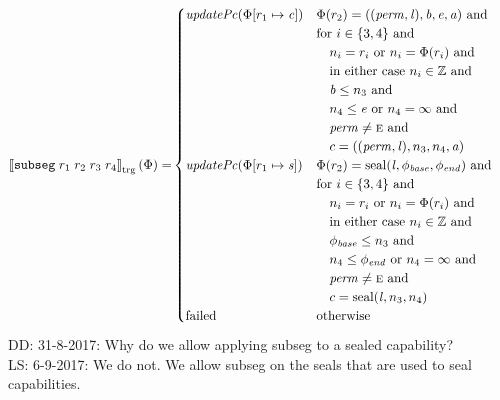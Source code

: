 \documentclass[a4paper]{article}
\newcommand\lau[1]{{\color{purple} \sf \footnotesize {LS: #1}}\\}
\newcommand\dominique[1]{{\color{purple} \sf \footnotesize {DD: #1}}\\}
\newcommand{\sem}[1]{\left\llbracket #1 \right\rrbracket}
\newcommand{\tsem}[2][\Phi]{\sem{#2}_{\mathrm{trg}}(#1)}
\newcommand{\tand}{\text{ and }}
\newcommand{\totherwise}{\text{otherwise }}
\newcommand{\targetcolor}[1]{\color{black}}
\newcommand{\trg}[1]{{\targetcolor{} #1}}
\newcommand{\zinstr}[1]{\texttt{#1}}
\newcommand{\fourinstr}[5]{
  \ifthenelse{\equal{#2#3#4#5}{}}
  {\zinstr{#1}}
  {\zinstr{#1} \; #2 \; #3 \; #4 \; #5}
}
\newcommand{\tsubseg}[4]{\fourinstr{\trg{subseg}}{#1}{#2}{#3}{#4}}
\newcommand{\ints}{\mathbb{Z}}
\newcommand{\update}[2]{[#1 \mapsto #2]}
\newcommand{\shareddom}[1]{\mathrm{#1}}
\newcommand{\perm}{\var{perm}}
\newcommand{\lin}{\var{l}}
\newcommand{\seal}[1]{\shareddom{seal}(#1)}
\newcommand{\failed}{\mathrm{failed}}
\newcommand{\var}[1]{\mathit{#1}}
\newcommand{\baddr}{\var{b}}
\newcommand{\eaddr}{\var{e}}
\newcommand{\aaddr}{\var{a}}
\newcommand{\plainperm}[1]{\textsc{#1}}
\newcommand{\enter}{\plainperm{e}}
\newcommand{\plainfun}[2]{
  \ifthenelse{\equal{#2}{}}
  {\mathit{#1}}
  {\mathit{#1}(#2)}
}
\newcommand{\updPcAddr}[1]{\plainfun{updatePc}{#1}}
\begin{document}
\begin{align*}
  \tsem{\tsubseg{r_1}{r_2}{r_3}{r_4}} = &
                                     \begin{cases}
                                       \updPcAddr{\Phi\update{r_1}{\var{c}}} &
                                       \arraycolsep=0pt
                                       \begin{array}[t]{l}
                                         \Phi(r_2) = ((\perm,\lin),\baddr, \eaddr, \aaddr) \tand \\
                                         \text{for $i \in \{3,4\}$ and} \\
                                         \quad n_i = r_i \text{ or } n_i = \Phi(r_i) \tand \\
                                         \quad \text{in either case $n_i \in \ints$ and} \\
                                         \quad \baddr \leq n_3 \tand \\
                                         \quad n_4 \leq \eaddr \text{ or } n_4 = \infty \tand \\
                                         \quad \perm \neq \enter \tand \\
                                         \quad c = ((\perm,\lin),n_3,n_4,\aaddr)
                                       \end{array} \\
                                       \updPcAddr{\Phi\update{r_1}{\var{s}}} &
                                       \arraycolsep=0pt
                                       \begin{array}[t]{l}
                                         \Phi(r_2) = \seal{\lin,\phi_{\var{base}},\phi_{\var{end}}} \tand \\
                                         \text{for $i \in \{3,4\}$ and} \\
                                         \quad n_i = r_i \text{ or } n_i = \Phi(r_i) \tand \\
                                         \quad \text{in either case $n_i \in \ints$ and} \\
                                         \quad \phi_{\var{base}} \leq n_3 \tand \\
                                         \quad n_4 \leq \phi_{\var{end}} \text{ or } n_4 = \infty \tand \\
                                         \quad \perm \neq \enter \tand \\
                                         \quad c = \seal{\lin, n_3,n_4}
                                       \end{array} \\
                                       \failed & \totherwise
                                     \end{cases}
\end{align*}
\dominique{31-8-2017: Why do we allow applying subseg to a sealed capability?}
\lau{6-9-2017: We do not. We allow subseg on the seals that are used to seal capabilities.}
\end{document}
